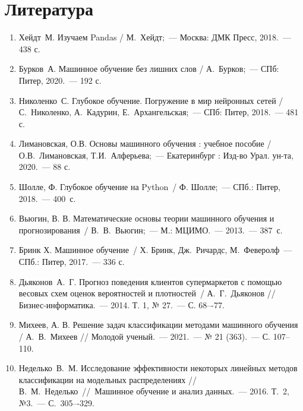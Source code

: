 \section{Литература}

\begin{enumerate}
	\item Хейдт М. Изучаем Pandas / М. Хейдт;~--- Москва: ДМК Пресс, 2018.~--- 438 с.
	\item Бурков А. Машинное обучение без лишних слов / А.~Бурков;~--- СПб: Питер, 2020.~--- 192 с.
	\item Николенко С. Глубокое обучение. Погружение в мир нейронных сетей / С.~Николенко, А.~Кадурин, Е.~Архангельская;~--- СПб: Питер, 2018.~--- 481 с.
	\item Лимановская, О.В. Основы машинного обучения : учебное пособие / О.В.~Лимановская, Т.И.~Алферьева;~--- Екатеринбург : Изд-во Урал. ун-та, 2020.~--- 88 с.
	\item Шолле, Ф. Глубокое обучение на Python / Ф. Шолле;~--- СПб.: Питер, 2018.~--- 400 с.
	\item Вьюгин, В. В. Математические основы теории машинного обучения и прогнозирования / В. В. Вьюгин;~--- М.: МЦИМО.~---  2013.~--- 387~с.
	\item Бринк Х. Машинное обучение / Х. Бринк, Дж. Ричардс, М. Феверолф~--- СПб.: Питер, 2017.~--- 336 с.
	\item Дьяконов А. Г. Прогноз поведения клиентов супермаркетов с помощью весовых схем оценок вероятностей и плотностей / А.~Г.~Дьяконов // Бизнес-информатика.~--- 2014. Т. 1, № 27.~--- С. 68–-77.
	\item Михеев, А. В. Решение задач классификации методами машинного обучения / А. В. Михеев // Молодой ученый.~--- 2021.~--- № 21 (363).~--- С. 107--110. 
	\item Неделько В. М. Исследование эффективности некоторых линейных методов классификации на модельных распределениях // В. М. Не\-делько // Машинное обучение и анализ данных.~--- 2016. Т. 2, №3.~--- С. 305–-329. 
\end{enumerate}
